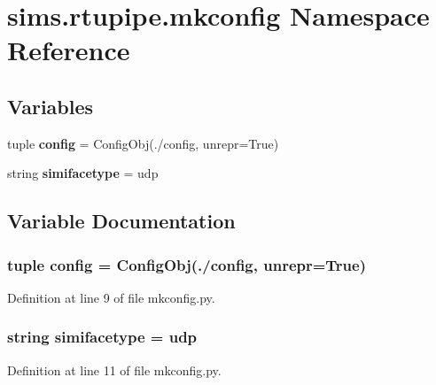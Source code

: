 \section{sims.\+rtupipe.\+mkconfig Namespace Reference}
\label{namespacesims_1_1rtupipe_1_1mkconfig}
\subsection*{Variables}
\begin{DoxyCompactItemize}
\item 
tuple {\bf config} = Config\+Obj(\textquotesingle{}./config\textquotesingle{}, unrepr=True)
\item 
string {\bf simifacetype} = \textquotesingle{}udp\textquotesingle{}
\end{DoxyCompactItemize}


\subsection{Variable Documentation}
\subsubsection[{config}]{\setlength{\rightskip}{0pt plus 5cm}tuple config = Config\+Obj(\textquotesingle{}./config\textquotesingle{}, unrepr=True)}\label{namespacesims_1_1rtupipe_1_1mkconfig_ad5f91786d7c873886a576621a2c1b0b5}


Definition at line 9 of file mkconfig.\+py.

\subsubsection[{simifacetype}]{\setlength{\rightskip}{0pt plus 5cm}string simifacetype = \textquotesingle{}udp\textquotesingle{}}\label{namespacesims_1_1rtupipe_1_1mkconfig_a7f5f5e89422cd15dfc1af6d7593d69c7}


Definition at line 11 of file mkconfig.\+py.

